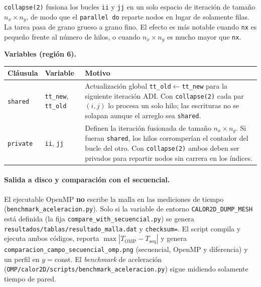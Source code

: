 \documentclass[11pt,a4paper]{article}
\begin{document}
\texttt{collapse(2)} fusiona los bucles \texttt{ii} y \texttt{jj} en un solo
espacio de iteraci\'on de tama\~no $n_x \times n_y$, de modo que el
\texttt{parallel do} reparte nodos en lugar de solamente filas. La tarea pasa de grano
grueso a grano fino. El efecto es m\'as notable cuando \texttt{nx} es pequeño
frente al n\'umero de hilos, o cuando $n_x \times n_y$ es mucho mayor que \texttt{nx}.

\medskip

\noindent\textbf{Variables (regi\'on 6).}
\begin{center}
\footnotesize
\begin{tabular}{@{}llM{7.6cm}@{}}
\hline
Cl\'ausula & Variable & Motivo \\
\hline
\texttt{shared} & \texttt{tt\_new}, \texttt{tt\_old} &
Actualizaci\'on global \texttt{tt\_old}$\leftarrow$\texttt{tt\_new} para la
siguiente iteraci\'on ADI. Con \texttt{collapse(2)} cada par $(i,j)$ lo procesa
un solo hilo; las escrituras no se solapan aunque el arreglo sea \texttt{shared}. \\
\texttt{private} & \texttt{ii}, \texttt{jj} &
Definen la iteraci\'on fusionada de tama\~no $n_x \times n_y$. Si fueran \texttt{shared},
los hilos corromper\'ian el contador del bucle del otro. Con \texttt{collapse(2)}
ambos deben ser privados para repartir nodos sin carrera en los \'indices. \\
\hline
\end{tabular}
\end{center}

\paragraph{Salida a disco y comparaci\'on con el secuencial.}
El ejecutable OpenMP \textbf{no} escribe la malla en las mediciones de tiempo
(\texttt{benchmark\_aceleracion.py}). Solo si la variable de entorno
\texttt{CALOR2D\_DUMP\_MESH} est\'a definida (la fija
\texttt{compare\_with\_secuencial.py}) se genera
\texttt{resultados/tablas/resultado\_malla.dat} y \texttt{checksum=}.
El script compila y ejecuta ambos c\'odigos, reporta $\max|T_{\mathrm{OMP}}-T_{\mathrm{seq}}|$ y genera
\texttt{comparacion\_campo\_secuencial\_omp.png} (secuencial, OpenMP y diferencia)
y un perfil en $y=\mathrm{const}$.
El \emph{benchmark} de aceleraci\'on (\texttt{OMP/calor2D/scripts/benchmark\_aceleracion.py})
sigue midiendo solamente tiempo de pared.
\end{document}
